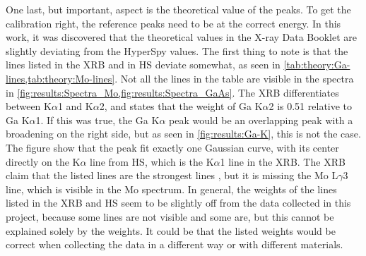 One last, but important, aspect is the theoretical value of the peaks.
To get the calibration right, the reference peaks need to be at the correct energy.
In this work, it was discovered that the theoretical values in the X-ray Data Booklet are slightly deviating from the HyperSpy values.
The first thing to note is that the lines listed in the XRB and in HS deviate somewhat, as seen in \cref{tab:theory:Ga-lines,tab:theory:Mo-lines}.
Not all the lines in the table are visible in the spectra in \cref{fig:results:Spectra_Mo,fig:results:Spectra_GaAs}.
The XRB differentiates between K$\alpha$1 and K$\alpha$2, and states that the weight of Ga K$\alpha$2 is 0.51 relative to Ga K$\alpha$1.
If this was true, the Ga K$\alpha$ peak would be an overlapping peak with a broadening on the right side, but as seen in \cref{fig:results:Ga-K}, this is not the case.
The figure show that the peak fit exactly one Gaussian curve, with its center directly on the K$\alpha$ line from HS, which is the K$\alpha$1 line in the XRB.
The XRB claim that the listed lines are the strongest lines \cite[P. 33, Sec. 1.2]{thompson_x-ray_2004}, but it is missing the Mo L$\gamma$3 line, which is visible in the Mo spectrum.
In general, the weights of the lines listed in the XRB and HS seem to be slightly off from the data collected in this project, because some lines are not visible and some are, but this cannot be explained solely by the weights.
It could be that the listed weights would be correct when collecting the data in a different way or with different materials.





